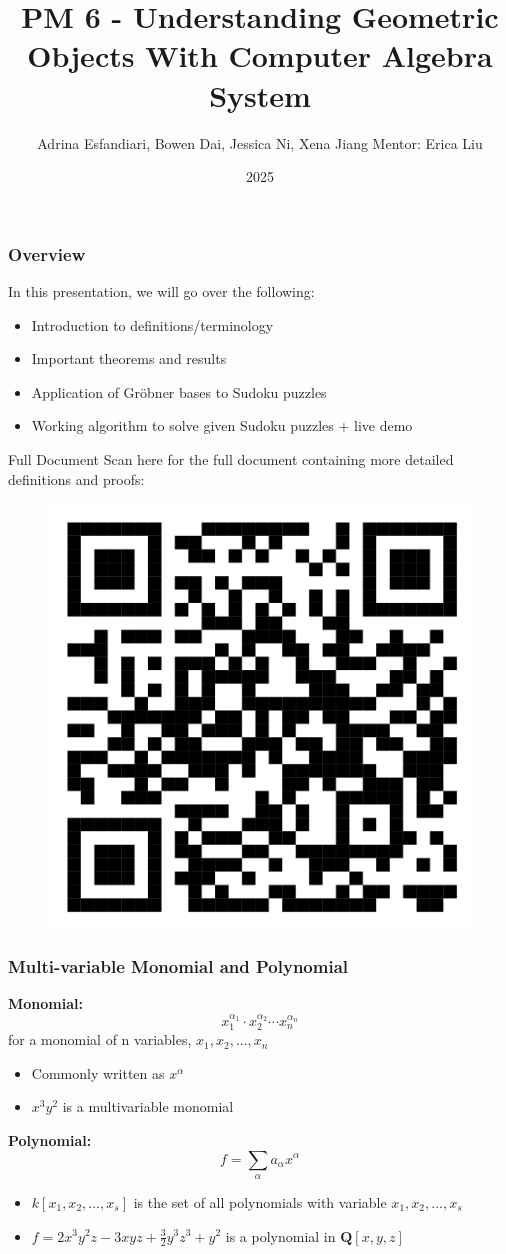\documentclass{beamer}
\title{PM 6 - Understanding Geometric Objects With Computer Algebra System}
\author{Adrina Esfandiari, Bowen Dai, Jessica Ni, Xena Jiang
\newline Mentor: Erica Liu}
\institute{WiM Directed Reading Program}
\date{2025}
\begin{document}
\frame{\titlepage}

\begin{frame}
\frametitle{Overview}
In this presentation, we will go over the following: 
\pause
\begin{itemize}
    \item Introduction to definitions/terminology
    \pause
    \item Important theorems and results
    \pause
    \item Application of Gröbner bases to Sudoku puzzles
    \pause
    \item Working algorithm to solve given Sudoku puzzles + live demo
\end{itemize}
\end{frame}

\begin{frame}{Full Document}
Scan here for the full document containing more detailed definitions and proofs:
\newline
\begin{figure}
    \includegraphics[width=0.45\linewidth]{images/DRP 2025 PM 6 Full Document.png}
    \centering
\end{figure}
    
\end{frame}

\begin{frame}
\frametitle{Multi-variable Monomial and Polynomial}
\textbf{Monomial:} $$x_1^{\alpha_1} \cdot x_2^{\alpha_2} \cdots x_n^{\alpha_n}$$ for a monomial of n variables, $x_1, x_2,..., x_n$
\begin{itemize}
 \item<1-> Commonly written as $x^\alpha$
 \item<1-> $x^3y^2$ is a multivariable monomial
\end{itemize}
\leavevmode
\newline
\textbf{Polynomial:}
$$f=\sum_\alpha a_\alpha x^\alpha$$
\begin{itemize}
 \item<1-> $k[x_1,x_2,\dots,x_s]$ is the set of all polynomials with variable $x_1,x_2,\dots,x_s$
 \item<1-> $f=2x^3y^2z-3xyz + \frac{3}{2}y^3z^3 +y^2$ is a polynomial in $\mathbf{Q}[x, y, z]$
\end{itemize}\leavevmode
\end{frame}
\end{document}
